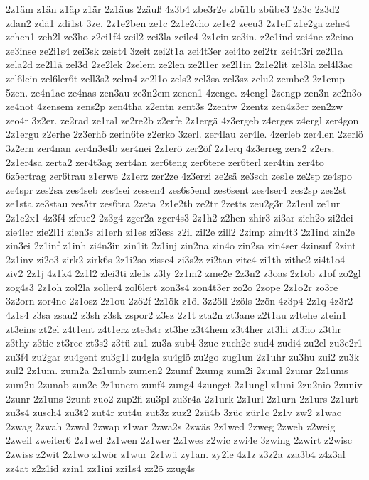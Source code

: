 {2z1äm
z1än
z1äp
z1är
2z1äus
2zäuß
4z3b4
zbe3r2e
zbü1b
zbübe3
2z3c
2z3d2
zdan2
zdä1
zdi1st
3ze.
2z1e2ben
ze1c
2z1e2cho
ze1e2
zeeu3
2z1eff
z1e2ga
zehe4
zehen1
zeh2l
ze3ho
z2ei1f4
zeil2
zei3la
zeile4
2z1ein
ze3in.
z2e1ind
zei4ne
z2eino
ze3inse
ze2i1s4
zei3sk
zeist4
3zeit
zei2t1a
zei4t3er
zei4to
zei2tr
zei4t3ri
ze2l1a
zela2d
ze2l1ä
zel3d
2ze2lek
2zelem
ze2len
ze2l1er
ze2l1in
2z1e2lit
zel3la
zel4l3ac
zel6lein
zel6ler6t
zell3s2
zelm4
ze2l1o
zels2
zel3sa
zel3sz
zelu2
zembe2
2z1emp
5zen.
ze4n1ac
ze4nas
zen3au
ze3n2em
zenen1
4zenge.
z4engl
2zengp
zen3n
ze2n3o
ze4not
4zensem
zens2p
zen4tha
z2entn
zent3s
2zentw
2zentz
zen4z3er
zen2zw
zeo4r
3z2er.
ze2rad
ze1ral
ze2re2b
z2erfe
2z1ergä
4z3ergeb
z4erges
z4ergl
zer4gon
2z1ergu
z2erhe
2z3erhö
zerin6te
z2erko
3zerl.
zer4lau
zer4le.
4zerleb
zer4len
2zerlö
3z2ern
zer4nan
zer4n3e4b
zer4nei
2z1erö
zer2öf
2z1erq
4z3erreg
zers2
z2ers.
2z1er4sa
zerta2
zer4t3ag
zert4an
zer6teng
zer6tere
zer6terl
zer4tin
zer4to
6z5ertrag
zer6trau
z1erwe
2z1erz
zer2ze
4z3erzi
ze2sä
ze3sch
zes1e
ze2sp
ze4spo
ze4spr
zes2sa
zes4seb
zes4sei
zessen4
zes6s5end
zes6sent
zes4ser4
zes2sp
zes2st
ze1sta
ze3stau
zes5tr
zes6tra
2zeta
2z1e2th
ze2tr
2zetts
zeu2g3r
2z1eul
ze1ur
2z1e2x1
4z3f4
zfeue2
2z3g4
zger2a
zger4s3
2z1h2
z2hen
zhir3
zi3ar
zich2o
zi2dei
zie4ler
zie2l1i
zien3s
zi1erh
zi1es
zi3ess
z2il
zil2e
zill2
2zimp
zim4t3
2z1ind
zin2e
zin3ei
2z1inf
z1inh
zi4n3in
zin1it
2z1inj
zin2na
zin4o
zin2sa
zin4ser
4zinsuf
2zint
2z1inv
zi2o3
zirk2
zirk6s
2z1i2so
zisse4
zi3s2z
zi2tan
zite4
zi1th
zithe2
zi4t1o4
ziv2
2z1j
4z1k4
2z1l2
zlei3ti
zle1s
z3ly
2z1m2
zme2e
2z3n2
z3oas
2z1ob
z1of
zo2gl
zog4s3
2z1oh
zol2la
zoller4
zol6lert
zon3s4
zon4t3er
zo2o
2zope
2z1o2r
zo3re
3z2orn
zor4ne
2z1osz
2z1ou
2zö2f
2z1ök
z1öl
3z2öll
2zöls
2zön
4z3p4
2z1q
4z3r2
4z1s4
z3sa
zsau2
z3sh
z3sk
zspor2
z3sz
2z1t
zta2n
zt3ane
z2t1au
z4tehe
ztein1
zt3eins
zt2el
z4t1ent
z4t1erz
zte3str
zt3he
z3t4hem
z3t4her
zt3hi
zt3ho
z3thr
z3thy
z3tic
zt3rec
zt3s2
z3tü
zu1
zu3a
zub4
3zuc
zuch2e
zud4
zudi4
zu2el
zu3e2r1
zu3f4
zu2gar
zu4gent
zu3g1l
zu4gla
zu4glö
zu2go
zug1un
2z1uhr
zu3hu
zui2
zu3k
zul2
2z1um.
zum2a
2z1umb
zumen2
2zumf
2zumg
zum2i
2zuml
2zumr
2z1ums
zum2u
2zunab
zun2e
2z1unem
zunf4
zung4
4zunget
2z1ungl
z1uni
2zu2nio
2zuniv
2zunr
2z1uns
2zunt
zuo2
zup2fi
zu3pl
zu3r4a
2z1urk
2z1url
2z1urn
2z1urs
2z1urt
zu3s4
zusch4
zu3t2
zut4r
zut4u
zut3z
zuz2
2zü4b
3züc
zür1c
2z1v
zw2
z1wac
2zwag
2zwah
2zwal
2zwap
z1war
2zwa2s
2zwäs
2z1wed
2zweg
2zweh
z2weig
2zweil
zweiter6
2z1wel
2z1wen
2z1wer
2z1wes
z2wic
zwi4e
3zwing
2zwirt
z2wisc
2zwiss
z2wit
2z1wo
z1wör
z1wur
2z1wü
zy1an.
zy2le
4z1z
z3z2a
zza3b4
z4z3al
zz4at
z2z1id
zzin1
zz1ini
zzi1s4
zz2ö
zzug4s
}

\endinput

